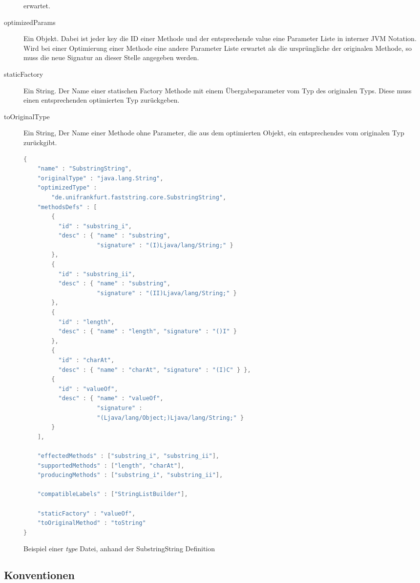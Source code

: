 \begin{description}
	erwartet. 
	\item[optimizedParams] Ein Objekt. Dabei ist jeder key die ID einer Methode 
	und der entsprechende value eine Parameter Liste in interner JVM Notation. 
	Wird bei einer Optimierung einer Methode eine andere Parameter Liste erwartet
	als die ursprüngliche der originalen Methode, so muss die neue Signatur an dieser
	Stelle angegeben werden.
	\item[staticFactory] Ein String. Der Name einer statischen Factory Methode mit 
	einem Übergabeparameter vom Typ des originalen Typs. Diese muss einen entsprechenden
	optimierten Typ zurückgeben.
	\item[toOriginalType] Ein String, Der Name einer Methode ohne Parameter, die
	aus dem optimierten Objekt, ein entsprechendes vom originalen Typ zurückgibt.

\end{description}

\begin{figure}[H]
	\begin{lstlisting}[language=Java]
{
	"name" : "SubstringString",
	"originalType" : "java.lang.String",
	"optimizedType" : 
		"de.unifrankfurt.faststring.core.SubstringString",
	"methodsDefs" : [
		{ 
		  "id" : "substring_i", 	
		  "desc" : { "name" : "substring", 
		  			 "signature" : "(I)Ljava/lang/String;" } 
		},
		{ 
		  "id" : "substring_ii", 	
		  "desc" : { "name" : "substring", 
		  			 "signature" : "(II)Ljava/lang/String;" } 
		},
		{ 
		  "id" : "length", 			
		  "desc" : { "name" : "length", "signature" : "()I" } 
		},
		{ 
		  "id" : "charAt", 
		  "desc" : { "name" : "charAt", "signature" : "(I)C" } },
		{ 
		  "id" : "valueOf", 
		  "desc" : { "name" : "valueOf", 
		  			 "signature" : 
		  			 "(Ljava/lang/Object;)Ljava/lang/String;" }
		}
	],

	"effectedMethods" : ["substring_i", "substring_ii"],
	"supportedMethods" : ["length", "charAt"],
	"producingMethods" : ["substring_i", "substring_ii"],

	"compatibleLabels" : ["StringListBuilder"],

	"staticFactory" : "valueOf",
	"toOriginalMethod" : "toString"
}
	\end{lstlisting} 
	\caption{Beispiel einer \textit{type} Datei, anhand der SubstringString Definition}\label{typeFile}
\end{figure}


\subsection{Konventionen}\label{subs:conventions}

